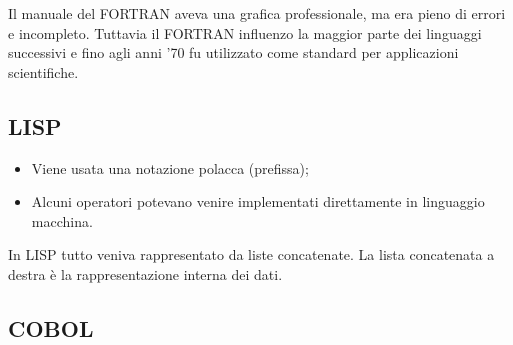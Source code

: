 Il manuale del FORTRAN aveva una grafica professionale, ma era pieno di errori e incompleto.
Tuttavia il FORTRAN influenzo la maggior parte dei linguaggi successivi e fino agli anni '70
fu utilizzato come standard per applicazioni scientifiche.

\subsection{LISP}


\begin{itemize}
    \item Viene usata una notazione polacca (prefissa);
    \item Alcuni operatori potevano venire implementati direttamente in linguaggio macchina.
\end{itemize}


In LISP tutto veniva rappresentato da liste concatenate. La lista concatenata a destra è la rappresentazione interna
dei dati.

\subsection{COBOL}

